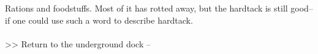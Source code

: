 Rations and foodstuffs. Most of it has rotted away, but the hardtack is still good--if one could use such a word to describe hardtack.\\
\\

>> Return to the underground dock -- 
